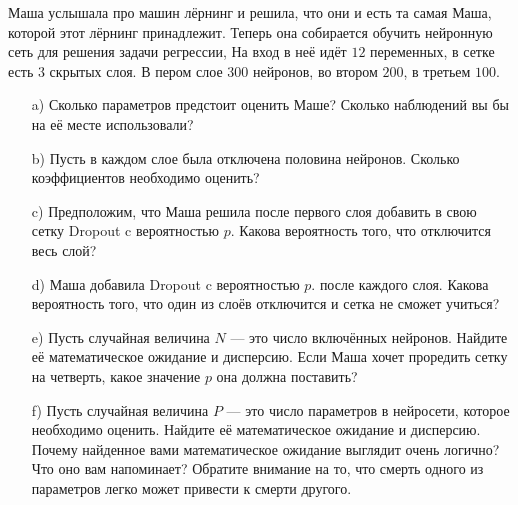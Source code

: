 \documentclass[12pt, a4paper, oneside]{article}
\newcounter{problem}
\renewcommand{\theproblem}{\arabic{problem}}
\newcommand{\problemname}{Задача}
\newenvironment{problem}{
	\addtocounter{problem}{1}\noindent{ \color{myblue} \large\bfseries \problemname{} \theproblem \newline }
}{
	\par\bigskip
}
\begin{document}
\begin{problem}
	Маша услышала про машин лёрнинг и решила, что они и есть та самая Маша, которой этот лёрнинг принадлежит. Теперь она собирается обучить нейронную сеть для решения задачи регрессии, На вход в неё идёт $12$ переменных, в сетке есть $3$ скрытых слоя. В пером слое $300$ нейронов, во втором $200$, в третьем $100$. 
	
	\begin{itemize}
		\item[a)] Сколько параметров предстоит оценить Маше?  Сколько наблюдений вы бы на её месте использовали? 
		\item[b)] Пусть в каждом слое была отключена половина нейронов. Сколько коэффициентов необходимо оценить?
		\item[c)] Предположим, что Маша решила после первого слоя добавить в свою сетку Dropout c вероятностью $p$.  Какова вероятность того, что отключится весь слой? 
		\item[d)] Маша добавила Dropout c вероятностью $p$. после каждого слоя. Какова вероятность того, что один из слоёв отключится и сетка не сможет учиться? 
		\item[e)] Пусть случайная величина $N$ --- это число включённых нейронов. Найдите её математическое ожидание и дисперсию. Если Маша хочет проредить сетку на четверть, какое значение $p$ она должна поставить? 
		\item[f)] Пусть случайная величина $P$ --- это число параметров в нейросети, которое необходимо оценить. Найдите её математическое ожидание и дисперсию. Почему найденное вами математическое ожидание выглядит очень логично? Что оно вам напоминает? Обратите внимание на то, что смерть одного из параметров легко может привести к смерти другого.
	\end{itemize}
\end{problem}
\end{document}

